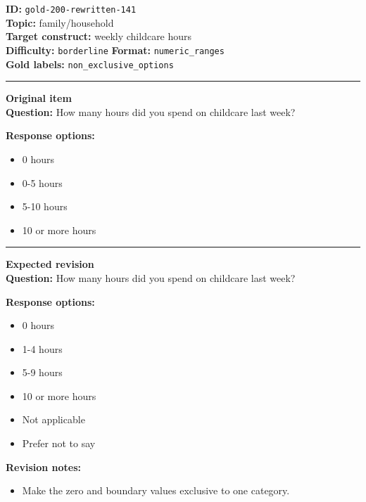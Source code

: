 \documentclass[10pt,a4paper]{article}
\newcommand{\sectionline}{\vspace{0.15em}\hrule\vspace{0.35em}}
\begin{document}
\begin{tcolorbox}[colframe=FlawRed,colback=white,colbacktitle=FlawRed!9,coltitle=black,title={Item 141\hfill Flawed item}]
\textbf{ID:} \texttt{gold-200-rewritten-141}\\
\textbf{Topic:} family/household\\
\textbf{Target construct:} weekly childcare hours\\
\textbf{Difficulty:} \texttt{borderline} \quad \textbf{Format:} \texttt{numeric\_ranges}\\
\textbf{Gold labels:} \texttt{non\_exclusive\_options}\\
\sectionline
\textbf{Original item}\\
\textbf{Question:} How many hours did you spend on childcare last week?
\par\textbf{Response options:}
\begin{itemize}
\item 0 hours
\item 0-5 hours
\item 5-10 hours
\item 10 or more hours
\end{itemize}
\sectionline
\textbf{Expected revision}\\
\textbf{Question:} How many hours did you spend on childcare last week?
\par\textbf{Response options:}
\begin{itemize}
\item 0 hours
\item 1-4 hours
\item 5-9 hours
\item 10 or more hours
\item Not applicable
\item Prefer not to say
\end{itemize}
\par\textbf{Revision notes:}
\begin{itemize}
\item Make the zero and boundary values exclusive to one category.
\end{itemize}
\end{tcolorbox}
\end{document}
